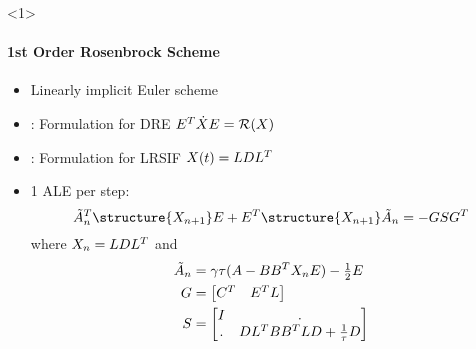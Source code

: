 \begin{frame}<1>{\subsecname}
\framesubtitle{1st Order Rosenbrock Scheme}
\begin{bigpicturecols}
  \begin{itemize}
    \item
      Linearly implicit Euler scheme
    \item
      \cite{Mena2007}: Formulation for DRE $E^T \dot X E = \operatorname{\mathcal R}(X)$
    \item
      \cite{Lang2017}: Formulation for LRSIF $X(t) = LDL^T$
    \item
      1 ALE per step:
      \begin{equation*}
        \tilde A_n^\T \structure{X_{n+1}} E + E^\T \structure{X_{n+1}} \tilde A_n = - GSG^\T
      \end{equation*}
      where $X_n = LDL^T$ and
      \begin{align*}
        \tilde A_n &= \gamma\tau(A-BB^T X_n E) - \tfrac{1}{2} E
        \\
        G &= \begin{bmatrix}
          C^T & E^T L
        \end{bmatrix}
        \\
        S &= \begin{bmatrix}
          I & . \\
          . & DL^T BB^T LD + \tfrac{1}{\tau} D
        \end{bmatrix}
      \end{align*}
      \vspace{-\baselineskip}
  \end{itemize}
  \vfill
\column{\bigpicturewidth}
\end{bigpicturecols}
\end{frame}

